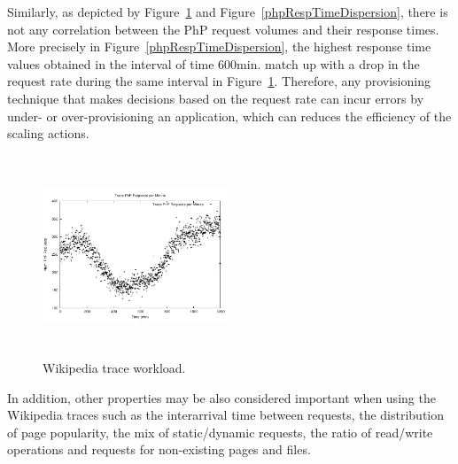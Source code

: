 Similarly, as depicted by Figure~\ref{workload} and Figure~\ref{phpRespTimeDispersion}, there is not any correlation between the PhP request volumes and their response times. More precisely in Figure~\ref{phpRespTimeDispersion}, the highest response time values obtained in the interval of time 600min. match up with a drop in the request rate during the same interval in Figure~\ref{workload}. Therefore, any provisioning technique that makes decisions based on the request rate can incur errors by under- or over-provisioning an application, which can reduces the efficiency of the scaling actions. 







\begin{figure}
\begin{center}
\includegraphics[width=0.49\textwidth, height=6cm]{./images/traceWorkload}
\end{center}
\caption{Wikipedia trace workload.}
\label{workload}
\end{figure}

In addition, other properties may be also considered important when using the Wikipedia traces such as the interarrival time between requests, the distribution of page popularity, the mix of static/dynamic requests, the ratio of read/write operations and requests for non-existing pages and files.

